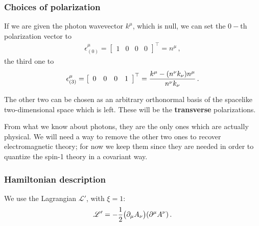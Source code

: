 \documentclass[main.tex]{subfiles}
\begin{document}
\subsubsection{Choices of polarization}

If we are given the photon wavevector \(k^{\mu }\), which is null, we can set the \(0-\)th polarization vector to 
%
\begin{align}
\epsilon^{\mu }_{(0)} = \left[\begin{array}{cccc}
1 & 0 & 0 & 0
\end{array}\right]^{\top}
= n^{\mu }
\,,
\end{align}
%
the third one to 
%
\begin{align}
\epsilon^{\mu }_{(3)} = \left[\begin{array}{cccc}
0 & 0 & 0 & 1
\end{array}\right]^{\top}
= \frac{k^{\mu } - \qty(n^{\nu }k_{\nu })n^{\mu }}{n^{\nu }k_{\nu }}
\,.
\end{align}

The other two can be chosen as an arbitrary orthonormal basis of the spacelike two-dimensional space which is left.
These will be the \textbf{transverse} polarizations. 

From what we know about photons, they are the only ones which are actually physical. 
We will need a way to remove the other two ones to recover electromagnetic theory; for now we keep them since they are needed in order to quantize the spin-1 theory in a covariant way. 

\subsubsection{Hamiltonian description}

We use the Lagrangian \(\mathscr{L}'\), with \(\xi =1 \): 
%
\begin{align}
\mathscr{L}' = - \frac{1}{2} \qty(\partial_{\mu } A_{\nu })\qty(\partial^{\mu } A^{\nu } )
\,.
\end{align}
\end{document}
